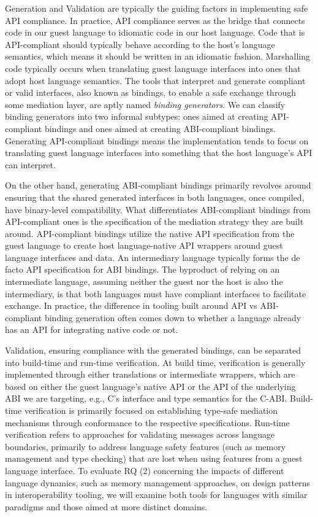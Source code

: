 Generation and Validation are typically the guiding factors in implementing safe API compliance. In practice, API compliance serves as the bridge that connects code in our guest language to idiomatic code in our host language. Code that is API-compliant should typically behave according to the host's language semantics, which means it should be written in an idiomatic fashion. Marshalling code typically occurs when translating guest language interfaces into ones that adopt host language semantics. The tools that interpret and generate compliant or valid interfaces, also known as bindings, to enable a safe exchange through some mediation layer, are aptly named \textit{binding generators}. We can classify binding generators into two informal subtypes: ones aimed at creating API-compliant bindings and ones aimed at creating ABI-compliant bindings. Generating API-compliant bindings means the implementation tends to focus on translating guest language interfaces into something that the host language's API can interpret.

On the other hand, generating ABI-compliant bindings primarily revolves around ensuring that the shared generated interfaces in both languages, once compiled, have binary-level compatibility. What differentiates ABI-compliant bindings from API-compliant ones is the specification of the mediation strategy they are built around. API-compliant bindings utilize the native API specification from the guest language to create host language-native API wrappers around guest language interfaces and data. An intermediary language typically forms the de facto API specification for ABI bindings. The byproduct of relying on an intermediate language, assuming neither the guest nor the host is also the intermediary, is that both languages must have compliant interfaces to facilitate exchange. In practice, the difference in tooling built around API vs ABI-compliant binding generation often comes down to whether a language already has an API for integrating native code or not. 

Validation, ensuring compliance with the generated bindings, can be separated into build-time and run-time verification. At build time, verification is generally implemented through either translations or intermediate wrappers, which are based on either the guest language's native API or the API of the underlying ABI we are targeting, e.g., C's interface and type semantics for the C-ABI. Build-time verification is primarily focused on establishing type-safe mediation mechanisms through conformance to the respective specifications. Run-time verification refers to approaches for validating messages across language boundaries, primarily to address language safety features (such as memory management and type checking) that are lost when using features from a guest language interface. To evaluate RQ (2) concerning the impacts of different language dynamics, such as memory management approaches, on design patterns in interoperability tooling, we will examine both tools for languages with similar paradigms and those aimed at more distinct domains.

